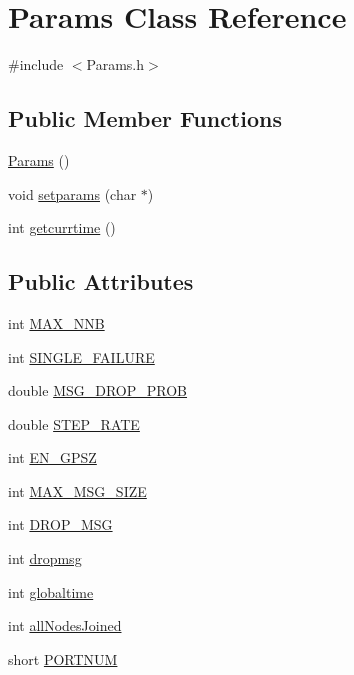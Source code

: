 \hypertarget{class_params}{}\section{Params Class Reference}
\label{class_params}


{\ttfamily \#include $<$Params.\+h$>$}

\subsection*{Public Member Functions}
\begin{DoxyCompactItemize}
\item 
\hyperlink{class_params_a1c0d445a3ea36e3b4d8696c55217fdd2}{Params} ()
\item 
void \hyperlink{class_params_a6b92907974ab5a62c22d1fb4eff45418}{setparams} (char $\ast$)
\item 
int \hyperlink{class_params_a4c0beb0ffc7e88794296821e9525dc75}{getcurrtime} ()
\end{DoxyCompactItemize}
\subsection*{Public Attributes}
\begin{DoxyCompactItemize}
\item 
int \hyperlink{class_params_ab0ec3d0aa36da465237f4b5d9bf1856b}{M\+A\+X\+\_\+\+N\+N\+B}
\item 
int \hyperlink{class_params_a6813393a8b7ebdf01015fe06eaa6c146}{S\+I\+N\+G\+L\+E\+\_\+\+F\+A\+I\+L\+U\+R\+E}
\item 
double \hyperlink{class_params_acbca0b55b1d12c20230f58e6d46d767b}{M\+S\+G\+\_\+\+D\+R\+O\+P\+\_\+\+P\+R\+O\+B}
\item 
double \hyperlink{class_params_a5631d479c6912c8992ccfe38ea6b4d2a}{S\+T\+E\+P\+\_\+\+R\+A\+T\+E}
\item 
int \hyperlink{class_params_ab60075ee5e58043a7bbc4d109f392ab4}{E\+N\+\_\+\+G\+P\+S\+Z}
\item 
int \hyperlink{class_params_a1a035f507c21541723dc558a348db075}{M\+A\+X\+\_\+\+M\+S\+G\+\_\+\+S\+I\+Z\+E}
\item 
int \hyperlink{class_params_a6e254d50de368dd9acd255c41178863f}{D\+R\+O\+P\+\_\+\+M\+S\+G}
\item 
int \hyperlink{class_params_ad57a790f4419c53a8e151d1e2e413454}{dropmsg}
\item 
int \hyperlink{class_params_ae261b965535fa59464980c03e521a554}{globaltime}
\item 
int \hyperlink{class_params_a492930a2987db99094640813eba1deff}{all\+Nodes\+Joined}
\item 
short \hyperlink{class_params_a390dcbc410d823fc387c0ef138f2e1aa}{P\+O\+R\+T\+N\+U\+M}
\end{DoxyCompactItemize}


